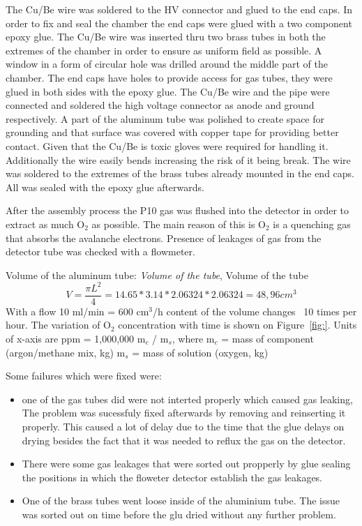 The Cu/Be wire was soldered to the HV connector and glued to the end caps. In
order to fix and seal the chamber the end caps were glued with a two component
epoxy glue.  The Cu/Be wire was inserted thru two brass tubes in both the
extremes of the chamber in order to ensure as uniform field as possible.  A
window in a form of circular hole was drilled around the middle part of the
chamber. The end caps have holes to provide access for gas tubes, they were
glued in both sides with the epoxy glue.  The Cu/Be wire and the pipe were
connected and soldered the high voltage connector as anode and ground
respectively. A part of the aluminum tube was polished to create space for
grounding and that surface was covered with copper tape for providing better
contact.  Given that the Cu/Be is toxic gloves were required for handling it.
Additionally the wire easily bends increasing the risk of it being break. The
wire was soldered to the extremes of the brass tubes already mounted in the end
caps. All was sealed with the epoxy glue afterwards.

After the assembly process the P10 gas was flushed into the detector in order to
extract as much O$_2$ as possible. The main reason of this is O$_2$ is a
quenching gas that absorbs the avalanche electrons.  Presence of leakages of gas
from the detector tube was checked with a flowmeter.

Volume of the aluminum tube: \emph{Volume of the tube}, Volume of the tube
\begin{equation}
  \label{eq:tube_volume}
  V=\frac{\pi L^2}{4} =14.65*3.14*2.06324*2.06324=48,96 cm^3
\end{equation}
With a flow 10 ml/min = 600 cm$^3$/h content of the volume changes ~10 times per
hour. The variation of O$_{2}$ concentration with time is shown on
Figure~\ref{fig:}. Units of x-axis are ppm = 1,000,000 m$_{c}$ / m$_{s}$, where
m$_{c}$ = mass of component (argon/methane mix, kg) m$_{s}$ = mass of solution
(oxygen, kg)

Some failures which were fixed were:
\begin{itemize}
\item one of the gas tubes did were not interted properly which caused gas
  leaking, The problem was sucessfuly fixed afterwards by removing and
  reinserting it properly.  This caused a lot of delay due to the time that the
  glue delays on drying besides the fact that it was needed to reflux the gas on
  the detector.
\item There were some gas leakages that were sorted out propperly by glue
  sealing the positions in which the floweter detector establish the gas
  leakages.
\item One of the brass tubes went loose inside of the aluminium tube. The issue
  was sorted out on time before the glu dried without any further problem.
\end{itemize}

